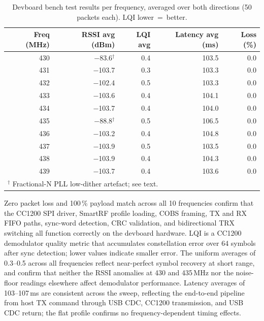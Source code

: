 \begin{table}[H]
    \centering
    \caption{Devboard bench test results per frequency, averaged over both directions (50 packets each). LQI lower~=~better.}
    \small
    \begin{tabular}{rrrrr}
        \toprule
        Freq (MHz) & RSSI avg (dBm) & LQI avg & Latency avg (ms) & Loss (\%) \\
        \midrule
        430 & $-$83.6$^\dagger$  & 0.4 & 103.5 & 0.0 \\
        431 & $-$103.7           & 0.3 & 103.3 & 0.0 \\
        432 & $-$102.4           & 0.5 & 103.3 & 0.0 \\
        433 & $-$103.6           & 0.4 & 104.1 & 0.0 \\
        434 & $-$103.7           & 0.4 & 104.0 & 0.0 \\
        435 & $-$88.8$^\dagger$  & 0.5 & 106.5 & 0.0 \\
        436 & $-$103.2           & 0.4 & 104.8 & 0.0 \\
        437 & $-$103.9           & 0.5 & 103.5 & 0.0 \\
        438 & $-$103.9           & 0.4 & 104.3 & 0.0 \\
        439 & $-$103.7           & 0.4 & 103.6 & 0.0 \\
        \bottomrule
        \multicolumn{5}{l}{\footnotesize $^\dagger$ Fractional-N PLL low-dither artefact; see text.}
    \end{tabular}
    \label{tab:devboard-bench}
\end{table}

Zero packet loss and 100\,\% payload match across all 10 frequencies confirm that the CC1200 SPI driver, SmartRF profile loading, COBS framing, TX and RX FIFO paths, sync-word detection, CRC validation, and bidirectional TRX switching all function correctly on the devboard hardware. LQI is a CC1200 demodulator quality metric that accumulates constellation error over 64 symbols after sync detection; lower values indicate smaller error. The uniform averages of 0.3--0.5 across all frequencies reflect near-perfect symbol recovery at short range, and confirm that neither the RSSI anomalies at 430 and 435\,MHz nor the noise-floor readings elsewhere affect demodulator performance. Latency averages of 103--107\,ms are consistent across the sweep, reflecting the end-to-end pipeline from host TX command through USB CDC, CC1200 transmission, and USB CDC return; the flat profile confirms no frequency-dependent timing effects.

